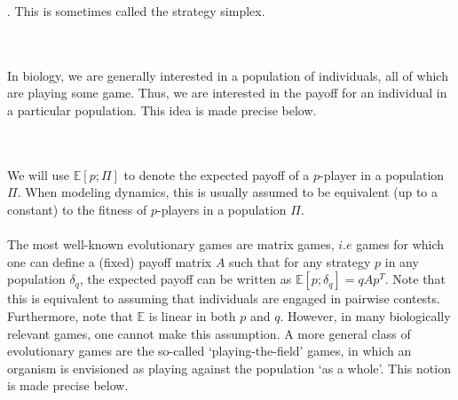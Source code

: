 . This is sometimes called the strategy simplex.

\\
\\
In biology, we are generally interested in a population of individuals, all of which are playing some game. Thus, we are interested in the payoff for an individual in a particular population. This idea is made precise below.

\\
\\
We will use $\mathbb{E}[p;\Pi]$ to denote the expected payoff of a $p$-player in a population $\Pi$. When modeling dynamics, this is usually assumed to be equivalent (up to a constant) to the fitness of $p$-players in a population $\Pi$.\\
\\
The most well-known evolutionary games are matrix games, $i.e$ games for which one can define a (fixed) payoff matrix $A$ such that for any strategy $p$ in any population $\delta_q$, the expected payoff can be written as $\mathbb{E}[p;\delta_{q}]=qAp^T$. Note that this is equivalent to assuming that individuals are engaged in pairwise contests. Furthermore, note that $\mathbb{E}$ is linear in both $p$ and $q$. However, in many biologically relevant games, one cannot make this assumption. A more general class of evolutionary games are the so-called `playing-the-field' games, in which an organism is envisioned as playing against the population `as a whole'. This notion is made precise below.

